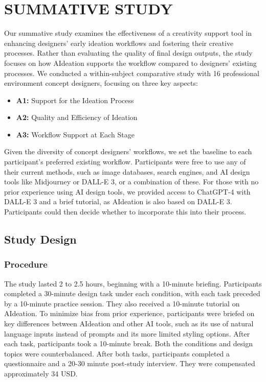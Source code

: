 \section{SUMMATIVE STUDY}

Our summative study examines the effectiveness of a creativity support tool in enhancing designers' early ideation workflows and fostering their creative processes. Rather than evaluating the quality of final design outputs, the study focuses on how AIdeation supports the workflow compared to designers' existing processes. We conducted a within-subject comparative study with 16 professional environment concept designers, focusing on three key aspects: 


\begin{itemize}
    \item \textbf{A1:} Support for the Ideation Process
    \item \textbf{A2:} Quality and Efficiency of Ideation 
    \item \textbf{A3:} Workflow Support at Each Stage
\end{itemize}
Given the diversity of concept designers' workflows, we set the baseline to each participant's preferred existing workflow. Participants were free to use any of their current methods, such as image databases, search engines, and AI design tools like Midjourney or DALL-E 3, or a combination of these. For those with no prior experience using AI design tools, we provided access to ChatGPT-4 with DALL-E 3 and a brief tutorial, as AIdeation is also based on DALL-E 3. Participants could then decide whether to incorporate this into their process.


\subsection{Study Design}
\subsubsection{Procedure}
The study lasted 2 to 2.5 hours, beginning with a 10-minute briefing. Participants completed a 30-minute design task under each condition, with each task preceded by a 10-minute practice session. They also received a 10-minute tutorial on AIdeation. To minimize bias from prior experience, participants were briefed on key differences between AIdeation and other AI tools, such as its use of natural language inputs instead of prompts and its more limited styling options. After each task, participants took a 10-minute break. Both the conditions and design topics were counterbalanced. After both tasks, participants completed a questionnaire and a 20-30 minute post-study interview. They were compensated approximately 34 USD.


